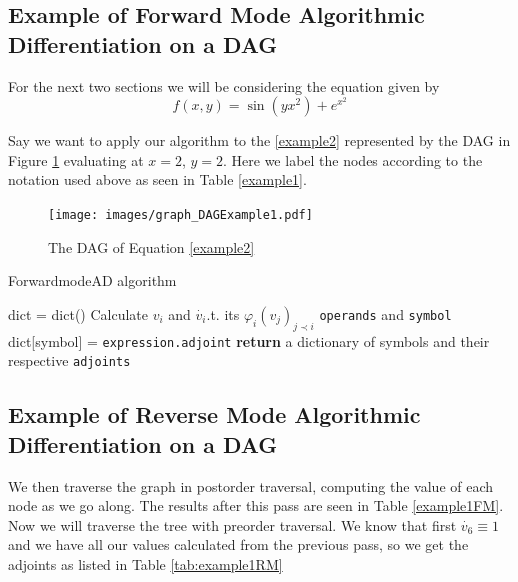 \documentclass{article}
\begin{document}
\subsection{Example of Forward Mode Algorithmic Differentiation on a DAG}

For the next two sections we will be considering the equation given by
\begin{equation}
    \label{example2}
    f(x,y) = \sin(yx^2) + e^{x^2}
\end{equation}

Say we want to apply our algorithm to the \ref{example2} represented by the DAG in Figure \ref{fig:DAGgraph} evaluating at $x=2$, $y=2$. Here we label the nodes according to the notation used above as seen in Table \ref{example1}. 




\begin{figure}[h!]
    \texttt{[image: images/graph\_DAGExample1.pdf]}
    \caption{The DAG of Equation \ref{example2}}
    \label{fig:DAGgraph}
\end{figure}



\begin{algorithm}[h]
\caption{ForwardmodeAD algorithm}\label{forwardAD}
\begin{algorithmic}[1]
\State dict = dict()\Comment{}
    \State Calculate $v_i$ and $\Dot{v_i}$.t. its $\varphi_i(v_j)_{j \prec i}$ \verb|operands| and \verb|symbol|
    \State dict[symbol] = \verb|expression.adjoint|
    \EndFor
\EndFor
\State \textbf{return} a dictionary of symbols and their respective \verb|adjoints|
\EndProcedure
\end{algorithmic}
\end{algorithm}

\subsection{Example of Reverse Mode Algorithmic Differentiation on a DAG}


We then traverse the graph in postorder traversal, computing the value of each node as we go along. The results after this pass are seen in Table \ref{example1FM}. Now we will traverse the tree with preorder traversal. We know that first $\dot{v_6} \equiv 1$ and we have all our values calculated from the previous pass, so we get the adjoints as listed in Table \ref{tab:example1RM}
\end{document}
